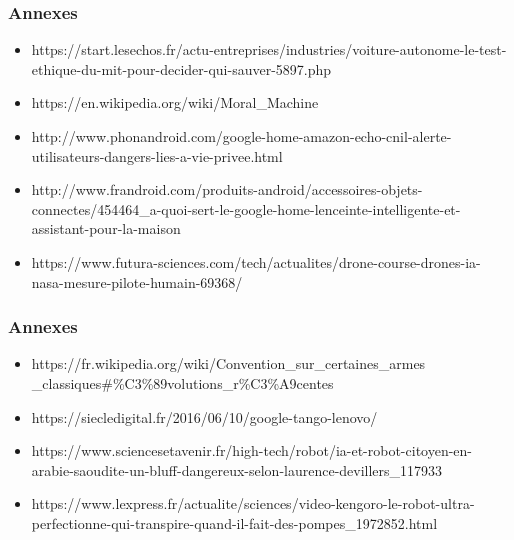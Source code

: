 \documentclass{beamer}
\begin{document}
	\begin{frame}
	\frametitle{Annexes}
	\begin{itemize}
	\itemsep1em
		\item https://start.lesechos.fr/actu-entreprises/industries/voiture-autonome-le-test-ethique-du-mit-pour-decider-qui-sauver-5897.php
		\item https://en.wikipedia.org/wiki/Moral\_Machine
		\item http://www.phonandroid.com/google-home-amazon-echo-cnil-alerte-utilisateurs-dangers-lies-a-vie-privee.html
		\item http://www.frandroid.com/produits-android/accessoires-objets-connectes/454464\_a-quoi-sert-le-google-home-lenceinte-intelligente-et-assistant-pour-la-maison
		\item https://www.futura-sciences.com/tech/actualites/drone-course-drones-ia-nasa-mesure-pilote-humain-69368/
	\end{itemize}
	\end{frame}
	
		\begin{frame}
	\frametitle{Annexes}
	\begin{itemize}
	\itemsep1em
		\item https://fr.wikipedia.org/wiki/Convention\_sur\_certaines\_armes\\
		\_classiques\#\%C3\%89volutions\_r\%C3\%A9centes
		\item https://siecledigital.fr/2016/06/10/google-tango-lenovo/
		\item https://www.sciencesetavenir.fr/high-tech/robot/ia-et-robot-citoyen-en-arabie-saoudite-un-bluff-dangereux-selon-laurence-devillers\_117933
		\item https://www.lexpress.fr/actualite/sciences/video-kengoro-le-robot-ultra-perfectionne-qui-transpire-quand-il-fait-des-pompes\_1972852.html
	\end{itemize}
	\end{frame}
	
\end{document}

